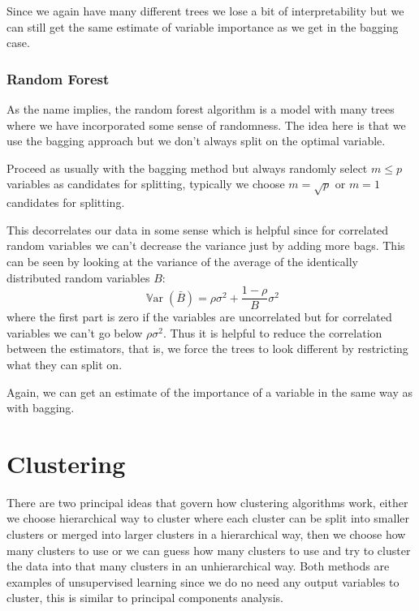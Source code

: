 \documentclass[a4paper, 12pt]{scrartcl}
\newcommand{\var}{\operatorname{\mathbb{V}ar}}
\begin{document}
Since we again have many different trees we lose a bit of interpretability but we can still get the same estimate of variable importance as we get in the bagging case.

\subsubsection*{Random Forest}
As the name implies, the random forest algorithm is a model with many trees where we have incorporated some sense of randomness.
The idea here is that we use the bagging approach but we don't always split on the optimal variable.

\begin{algorithm}
	Proceed as usually with the bagging method but always randomly select $m\leq p$ variables as candidates for splitting, typically we choose $m=\sqrt{p}$ or $m=1$ candidates for splitting.
\end{algorithm}

This decorrelates our data in some sense which is helpful since for correlated random variables we can't decrease the variance just by adding more bags.
This can be seen by looking at the variance of the average of the identically distributed random variables $B$:
\begin{equation*}
	\var\left(\bar{B}\right)=\rho\sigma^2+\frac{1-\rho}{B}\sigma^2
\end{equation*}
where the first part is zero if the variables are uncorrelated but for correlated variables we can't go below $\rho\sigma^2$.
Thus it is helpful to reduce the correlation between the estimators, that is, we force the trees to look different by restricting what they can split on.

Again, we can get an estimate of the importance of a variable in the same way as with bagging.

\section{Clustering}
There are two principal ideas that govern how clustering algorithms work, either we choose hierarchical way to cluster where each cluster can be split into smaller clusters or merged into larger clusters in a hierarchical way, then we choose how many clusters to use or we can guess how many clusters to use and try to cluster the data into that many clusters in an unhierarchical way.
Both methods are examples of unsupervised learning since we do no need any output variables to cluster, this is similar to principal components analysis.
\end{document}
